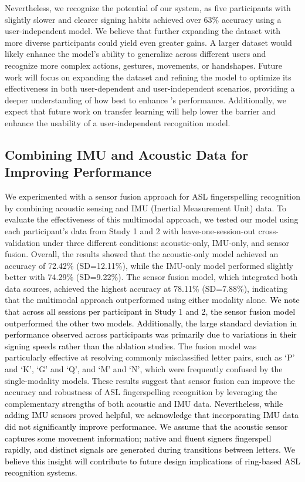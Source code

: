 {Nevertheless, we recognize the potential of our system, as five participants with slightly slower and clearer signing habits achieved over 63\% accuracy using a user-independent model.} We believe that further expanding the dataset with more diverse participants could yield even greater gains. A larger dataset would likely enhance the model's ability to generalize across different users and recognize more complex actions, gestures, movements, or handshapes. Future work will focus on expanding the dataset and refining the model to optimize its effectiveness in both user-dependent and user-independent scenarios, providing a deeper understanding of how best to enhance \theDevice{}'s performance. Additionally, we expect that future work on transfer learning will help lower the barrier and enhance the usability of a user-independent recognition model.

\subsection{Combining IMU and Acoustic Data for Improving Performance}
We experimented with a sensor fusion approach for ASL fingerspelling recognition by combining acoustic sensing and IMU (Inertial Measurement Unit) data. To evaluate the effectiveness of this multimodal approach, we tested our model using each participant's data from Study 1 and 2 with leave-one-session-out cross-validation under three different conditions: acoustic-only, IMU-only, and sensor fusion. 
Overall, the results showed that the acoustic-only model achieved an accuracy of 72.42\% (SD=12.11\%), while the IMU-only model performed slightly better with 74.29\% (SD=9.22\%). The sensor fusion model, which integrated both data sources, achieved the highest accuracy at 78.11\% (SD=7.88\%), indicating that the multimodal approach outperformed using either modality alone. \textcolor{black}{We note that across all sessions per participant in Study 1 and 2, the sensor fusion model outperformed the other two models. Additionally, the large standard deviation in performance observed across participants was primarily due to variations in their signing speeds rather than the ablation studies.} The fusion model was particularly effective at resolving commonly misclassified letter pairs, such as `P' and `K', `G' and `Q', and `M' and `N', which were frequently confused by the single-modality models. These results suggest that sensor fusion can improve the accuracy and robustness of ASL fingerspelling recognition by leveraging the complementary strengths of both acoustic and IMU data. \textcolor{black}{Nevertheless, while adding IMU sensors proved helpful, we acknowledge that incorporating IMU data did not significantly improve performance. We assume that the acoustic sensor captures some movement information; native and fluent signers fingerspell rapidly, and distinct signals are generated during transitions between letters. We believe this insight will contribute to future design implications of ring-based ASL recognition systems.}

